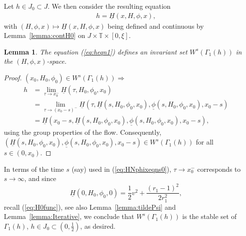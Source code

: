 \documentclass[reqno,12pt]{amsart}
\newcommand{\eqlab}[1]{\label{eq:#1}}
\renewcommand{\eqref}[1]{(\ref{eq:#1})}
\newcommand{\lemmaref}[1]{Lemma~\ref{lemma:#1}}
\newcommand{\thmref}[1]{Theorem~\ref{theorem:#1}}
\newtheorem{lemma}[theorem]{Lemma}
\numberwithin{equation}{section}
\begin{document}
Let $h\in J_0\subset J$. We then consider the resulting equation
\begin{align}
 h = \underline H(x,H,\phi,x),\eqlab{heqn1}
\end{align}
with $(H,\phi,x)\mapsto \underline H(x,H,\phi,x)$ being  defined and continuous by \lemmaref{contH0} on $J\times \mathbb T\times [0,\xi]$. 
\begin{lemma}
The equation \eqref{heqn1} defines an invariant set $W^s(\Gamma_1(h))$ in the $(H,\phi,x)$-space. 
\end{lemma}
\begin{proof} $(x_0,H_0,\phi_0)\in W^s(\Gamma_1(h))\Longrightarrow $
\begin{align*}
 h& = \lim_{\tau\rightarrow x_0^-}\underline H(\tau,H_0,\phi_0,x_0)\\
 &=\lim_{\tau\rightarrow (x_0-s)^-}\underline H(\tau,\underline H(s,H_0,\phi_0,x_0),\underline \phi(s,H_0,\phi_0,x_0),x_0-s)\\
 &=\underline H(x_0-s,\underline H(s,H_0,\phi_0,x_0),\underline \phi(s,H_0,\phi_0,x_0),x_0-s),
\end{align*}
using the group properties of the flow. Consequently, $(\underline H(s,H_0,\phi_0,x_0),\underline \phi(s,H_0,\phi_0,x_0),x_0-s)\in W^s(\Gamma_1(h))$ for all $s\in (0,x_0)$. 
\end{proof}
In terms of the time $s$ (say) used in \eqref{HNphixeqns0}, $\tau\rightarrow x_0^-$ corresponds to $s\rightarrow \infty$, and since $$\underline H(0,H_0,\phi_0,0)=\frac12 v^2+\frac{(r_1-1)^2}{2r_1^2},$$ recall \eqref{H0func}, see also \lemmaref{tildePsi} and \lemmaref{Iterative}, we conclude that $W^s(\Gamma_1(h))$ is the stable set of $\Gamma_1(h)$, $h\in J_0\subset (0,\frac12)$, as desired.
%  


% 
\end{document}
